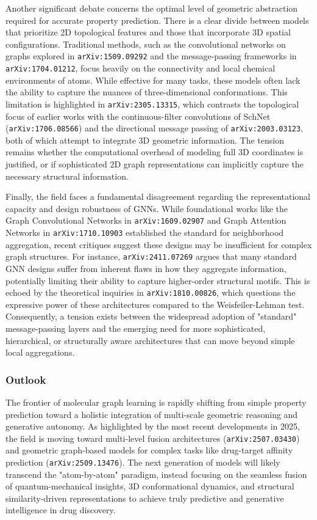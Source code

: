 \documentclass[11pt]{article}
\begin{document}
Another significant debate concerns the optimal level of geometric abstraction required for accurate property prediction. There is a clear divide between models that prioritize 2D topological features and those that incorporate 3D spatial configurations. Traditional methods, such as the convolutional networks on graphs explored in \texttt{arXiv:1509.09292} and the message-passing frameworks in \texttt{arXiv:1704.01212}, focus heavily on the connectivity and local chemical environments of atoms. While effective for many tasks, these models often lack the ability to capture the nuances of three-dimensional conformations. This limitation is highlighted in \texttt{arXiv:2305.13315}, which contrasts the topological focus of earlier works with the continuous-filter convolutions of SchNet (\texttt{arXiv:1706.08566}) and the directional message passing of \texttt{arXiv:2003.03123}, both of which attempt to integrate 3D geometric information. The tension remains whether the computational overhead of modeling full 3D coordinates is justified, or if sophisticated 2D graph representations can implicitly capture the necessary structural information.

Finally, the field faces a fundamental disagreement regarding the representational capacity and design robustness of GNNs. While foundational works like the Graph Convolutional Networks in \texttt{arXiv:1609.02907} and Graph Attention Networks in \texttt{arXiv:1710.10903} established the standard for neighborhood aggregation, recent critiques suggest these designs may be insufficient for complex graph structures. For instance, \texttt{arXiv:2411.07269} argues that many standard GNN designs suffer from inherent flaws in how they aggregate information, potentially limiting their ability to capture higher-order structural motifs. This is echoed by the theoretical inquiries in \texttt{arXiv:1810.00826}, which questions the expressive power of these architectures compared to the Weisfeiler-Lehman test. Consequently, a tension exists between the widespread adoption of "standard" message-passing layers and the emerging need for more sophisticated, hierarchical, or structurally aware architectures that can move beyond simple local aggregations.

\subsubsection{Outlook}

The frontier of molecular graph learning is rapidly shifting from simple property prediction toward a holistic integration of multi-scale geometric reasoning and generative autonomy. As highlighted by the most recent developments in 2025, the field is moving toward multi-level fusion architectures (\texttt{arXiv:2507.03430}) and geometric graph-based models for complex tasks like drug-target affinity prediction (\texttt{arXiv:2509.13476}). The next generation of models will likely transcend the "atom-by-atom" paradigm, instead focusing on the seamless fusion of quantum-mechanical insights, 3D conformational dynamics, and structural similarity-driven representations to achieve truly predictive and generative intelligence in drug discovery.
\end{document}
